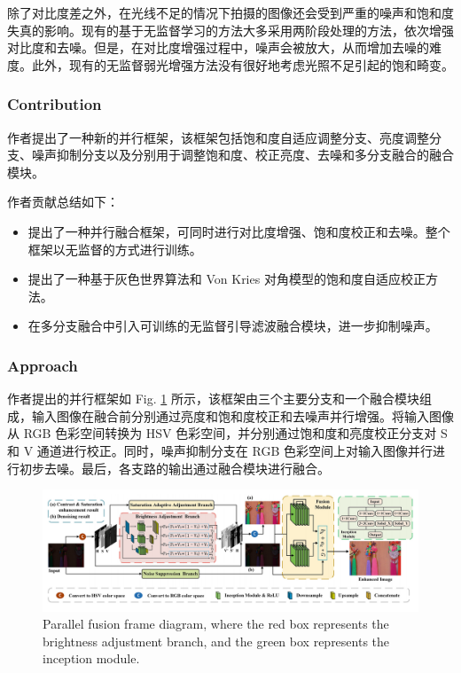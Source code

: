\documentclass[a4paper, 10pt]{article}
\begin{document}
			除了对比度差之外，在光线不足的情况下拍摄的图像还会受到严重的噪声和饱和度失真的影响。现有的基于无监督学习的方法大多采用两阶段处理的方法，依次增强对比度和去噪。但是，在对比度增强过程中，噪声会被放大，从而增加去噪的难度。此外，现有的无监督弱光增强方法没有很好地考虑光照不足引起的饱和畸变。
			
			\subsubsection{Contribution}
			
			作者提出了一种新的并行框架，该框架包括饱和度自适应调整分支、亮度调整分支、噪声抑制分支以及分别用于调整饱和度、校正亮度、去噪和多分支融合的融合模块。
			
			作者贡献总结如下：
			
			\begin{itemize}
				\item[(1)] 
				提出了一种并行融合框架，可同时进行对比度增强、饱和度校正和去噪。整个框架以无监督的方式进行训练。
				
				\item[(2)]
				提出了一种基于灰色世界算法和 Von Kries 对角模型的饱和度自适应校正方法。
				
				\item[(3)]
				在多分支融合中引入可训练的无监督引导滤波融合模块，进一步抑制噪声。
								
			\end{itemize}	
			
			\subsubsection{Approach}
			
			作者提出的并行框架如 Fig. \ref{fig: Parallel fusion frame diagram} 所示，该框架由三个主要分支和一个融合模块组成，输入图像在融合前分别通过亮度和饱和度校正和去噪声并行增强。将输入图像从 RGB 色彩空间转换为 HSV 色彩空间，并分别通过饱和度和亮度校正分支对 S 和 V 通道进行校正。同时，噪声抑制分支在 RGB 色彩空间上对输入图像并行进行初步去噪。最后，各支路的输出通过融合模块进行融合。
			
			\begin{figure}[htbp]
				\centering 
				\includegraphics[width=\columnwidth]{picture/LLIE/Fusion-Based LLIE/Parallel fusion frame diagram}
				\caption{
					\label{fig: Parallel fusion frame diagram} 
					Parallel fusion frame diagram, where the red box represents the brightness adjustment branch, and the green box represents the inception module. 
				}
			\end{figure}
			
\end{document}
